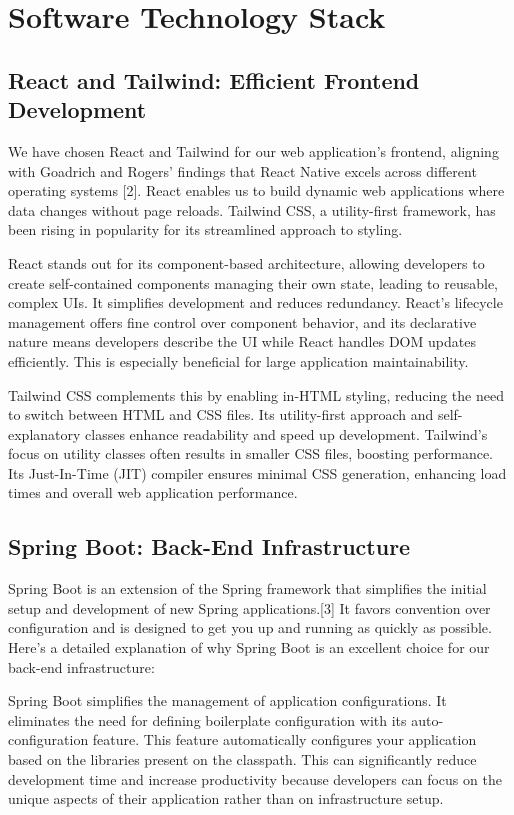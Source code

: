 \section{Software Technology Stack}
\label{sec:technology}

\subsection{React and Tailwind: Efficient Frontend Development}

We have chosen React and Tailwind for our web application's frontend, aligning with Goadrich and Rogers' findings that React Native excels across different operating systems [2]. React enables us to build dynamic web applications where data changes without page reloads. Tailwind CSS, a utility-first framework, has been rising in popularity for its streamlined approach to styling.

React stands out for its component-based architecture, allowing developers to create self-contained components managing their own state, leading to reusable, complex UIs. It simplifies development and reduces redundancy. React's lifecycle management offers fine control over component behavior, and its declarative nature means developers describe the UI while React handles DOM updates efficiently. This is especially beneficial for large application maintainability.

Tailwind CSS complements this by enabling in-HTML styling, reducing the need to switch between HTML and CSS files. Its utility-first approach and self-explanatory classes enhance readability and speed up development. Tailwind's focus on utility classes often results in smaller CSS files, boosting performance. Its Just-In-Time (JIT) compiler ensures minimal CSS generation, enhancing load times and overall web application performance.

\subsection{Spring Boot: Back-End Infrastructure}
Spring Boot is an extension of the Spring framework that simplifies the initial setup and development of new Spring applications.[3] 
It favors convention over configuration and is designed to get you up and running as quickly as possible. Here's a detailed explanation of why Spring Boot is an excellent choice for our back-end infrastructure:

Spring Boot simplifies the management of application configurations. 
It eliminates the need for defining boilerplate configuration with its auto-configuration feature.
This feature automatically configures your application based on the libraries present on the classpath. 
This can significantly reduce development time and increase productivity because developers can focus on the unique aspects of their application rather than on infrastructure setup. 

